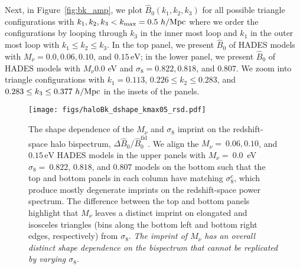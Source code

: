 \documentclass[12pt, letterpaper, preprint]{aastex62}
\newcommand{\smnu}{M_\nu}
\newcommand{\sig}{\sigma_8}
\newcommand{\BOk}{\widehat{B}_0}
\begin{document}
Next, in Figure~\ref{fig:bk_amp}, we plot $\BOk(k_1, k_2, k_3)$ for all possible triangle 
configurations with $k_1, k_2, k_3 < k_{\rm max} = 0.5~h/{\rm Mpc}$ where we order the 
configurations by looping through $k_3$ in the inner most loop and $k_1$ in the outer most 
loop with $k_1 \leq k_2 \leq k_3$. In the top panel, we present $\BOk$ of HADES models 
with $\smnu = 0.0, 0.06, 0.10$, and $0.15\,\mathrm{eV}$; in the lower panel, we present 
$\BOk$ of HADES models with $\smnu 0.0$ eV and $\sig = 0.822, 0.818$, and $0.807$. We 
zoom into triangle configurations with $k_1 = 0.113$, $0.226 \leq k_2 \leq 0.283$, 
and $0.283 \leq k_3 \leq 0.377~h/{\rm Mpc}$ in the insets of the panels. 

\begin{figure}
\begin{center}
\texttt{[image: figs/haloBk\_dshape\_kmax05\_rsd.pdf]} 
    \caption{The shape dependence of the $\smnu$ and $\sig$ imprint on 
    the redshift-space halo bispectrum, $\Delta \BOk/\BOk^\mathrm{fid}$. 
    We align the $\smnu{=}~0.06, 0.10$, and $0.15\,\mathrm{eV}$ HADES models 
    in the upper panels with $\smnu{=}~0.0$~eV $\sig{=}~0.822$, $0.818$, and $0.807$ 
    models on the bottom such that the top and bottom panels in each column 
    have matching $\sig^{c}$, which produce mostly degenerate imprints on the 
    redshift-space power spectrum. The difference between the top and bottom 
    panels highlight that $\smnu$ leaves a distinct imprint on elongated and 
    isosceles triangles (bins along the bottom left and bottom right edges, 
    respectively) from $\sig$. {\em The imprint of $\smnu$ has an overall 
    distinct shape dependence on the bispectrum that cannot be replicated by 
    varying $\sig$}. 
    }
\label{fig:dbk_shape}
\end{center}
\end{figure}
\end{document}
